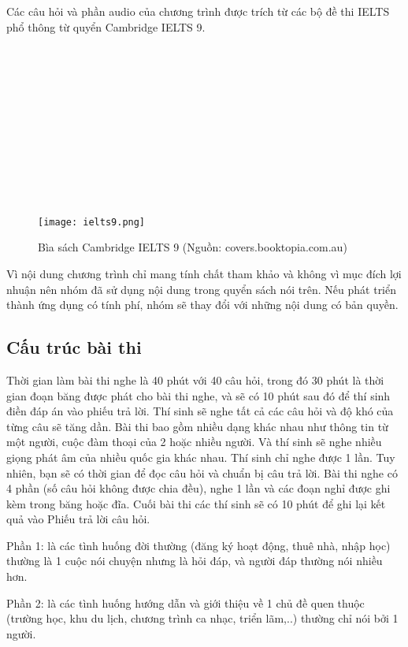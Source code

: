 Các câu hỏi và phần audio của chương trình được trích từ các bộ đề thi IELTS phổ thông từ quyển Cambridge IELTS 9.\\
\\
\\
\\
\\
\\
\\
\\
\\
\\
\\
\\
\begin{figure}[!htb] 
\centering
\texttt{[image: ielts9.png]}
\caption{Bìa sách Cambridge IELTS 9 (Nguồn: covers.booktopia.com.au)}
\end{figure}

Vì nội dung chương trình chỉ mang tính chất tham khảo và không vì mục đích lợi nhuận nên nhóm đã sử dụng nội dung trong quyển sách nói trên. Nếu phát triển thành ứng dụng có tính phí, nhóm sẽ thay đổi với những nội dung có bản quyền.

\subsection{Cấu trúc bài thi}

Thời gian làm bài thi nghe là 40 phút với 40 câu hỏi, trong đó 30 phút là thời gian đoạn băng được phát cho bài thi nghe, và sẽ có 10 phút sau đó để thí sinh điền đáp án vào phiếu trả lời. Thí sinh sẽ nghe tất cả các câu hỏi và độ khó của từng câu sẽ tăng dần. Bài thi bao gồm nhiều dạng khác nhau như thông tin từ một người, cuộc đàm thoại của 2 hoặc nhiều người. Và thí sinh sẽ nghe nhiều giọng phát âm của nhiều quốc gia khác nhau. Thí sinh chỉ nghe được 1 lần. Tuy nhiên, bạn sẽ có thời gian để đọc câu hỏi và chuẩn bị câu trả lời. Bài thi nghe có 4 phần (số câu hỏi không được chia đều), nghe 1 lần và các đoạn nghỉ được ghi kèm trong băng hoặc đĩa. Cuối bài thi các thí sinh sẽ có 10 phút để ghi lại kết quả vào Phiếu trả lời câu hỏi.

\quad Phần 1: là các tình huống đời thường (đăng ký hoạt động, thuê nhà, nhập học) thường là 1 cuộc nói chuyện nhưng là hỏi đáp, và người đáp thường nói nhiều hơn.

\quad Phần 2: là các tình huống hướng dẫn và giới thiệu về 1 chủ đề quen thuộc (trường học, khu du lịch, chương trình ca nhạc, triển lãm,..) thường chỉ nói bởi 1 người.

